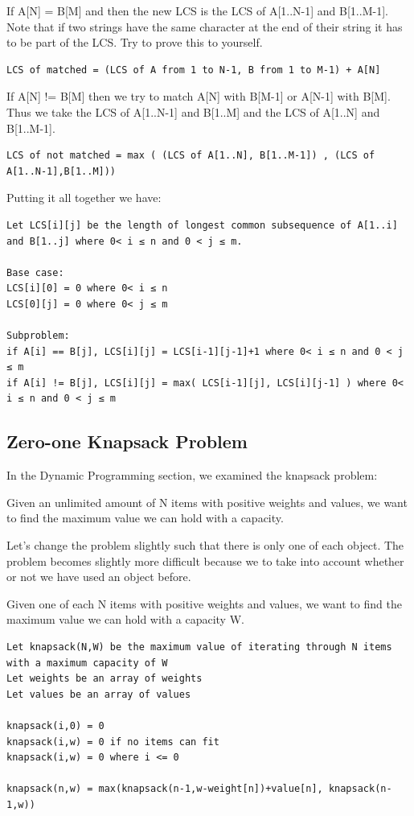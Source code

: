 \documentclass[11pt,oneside]{book}
\begin{document}
If A[N] = B[M] and then the new LCS is the LCS of A[1..N-1] and B[1..M-1]. Note that if two strings have the same character at the end of their string it has to be part of the LCS. Try to prove this to yourself.

\begin{lstlisting}
LCS of matched = (LCS of A from 1 to N-1, B from 1 to M-1) + A[N]
\end{lstlisting}

If A[N] != B[M] then we try to match A[N] with B[M-1] or A[N-1] with B[M]. Thus we take the LCS of A[1..N-1] and B[1..M] and the LCS of A[1..N] and B[1..M-1].

\begin{lstlisting}
LCS of not matched = max ( (LCS of A[1..N], B[1..M-1]) , (LCS of A[1..N-1],B[1..M]))
\end{lstlisting}

Putting it all together we have:

\begin{lstlisting}
Let LCS[i][j] be the length of longest common subsequence of A[1..i] and B[1..j] where 0< i ≤ n and 0 < j ≤ m.

Base case:
LCS[i][0] = 0 where 0< i ≤ n
LCS[0][j] = 0 where 0< j ≤ m

Subproblem:
if A[i] == B[j], LCS[i][j] = LCS[i-1][j-1]+1 where 0< i ≤ n and 0 < j ≤ m
if A[i] != B[j], LCS[i][j] = max( LCS[i-1][j], LCS[i][j-1] ) where 0< i ≤ n and 0 < j ≤ m
\end{lstlisting}

\subsection{Zero-one Knapsack Problem}

In the Dynamic Programming section, we examined the knapsack problem:

Given an unlimited amount of N items with positive weights and values, we want to find the maximum value we can hold with a capacity.

Let's change the problem slightly such that there is only one of each object. The problem becomes slightly more difficult because we to take into account whether or not we have used an object before.

Given one of each N items with positive weights and values, we want to find the maximum value we can hold with a capacity W.

\begin{lstlisting}
Let knapsack(N,W) be the maximum value of iterating through N items with a maximum capacity of W
Let weights be an array of weights
Let values be an array of values

knapsack(i,0) = 0
knapsack(i,w) = 0 if no items can fit
knapsack(i,w) = 0 where i <= 0

knapsack(n,w) = max(knapsack(n-1,w-weight[n])+value[n], knapsack(n-1,w))
\end{lstlisting}
\end{document}
